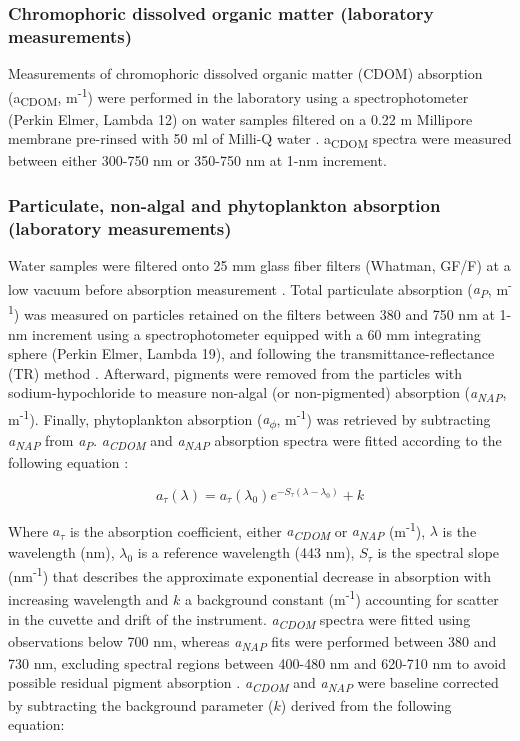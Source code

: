 \documentclass[essd, manuscript]{copernicus}
\begin{document}
\subsubsection{Chromophoric dissolved organic matter (laboratory measurements)}

Measurements of chromophoric dissolved organic matter (CDOM) absorption (a\textsubscript{CDOM}, m\textsuperscript{-1}) were performed in the laboratory using a spectrophotometer (Perkin Elmer, Lambda 12) on water samples filtered on a 0.22 \textmu m Millipore membrane pre-rinsed with 50 ml of Milli-Q water \citep{Babin2003b}. a\textsubscript{CDOM} spectra were measured between either 300-750 nm or 350-750 nm at 1-nm increment.

\subsubsection{Particulate, non-algal and phytoplankton absorption (laboratory measurements)}

Water samples were filtered onto 25 mm glass fiber filters (Whatman, GF/F) at a low vacuum before absorption measurement \citep{Babin2003b}. Total particulate absorption (\textit{a\textsubscript{P}}, m\textsuperscript{-1}) was measured on particles retained on the filters between 380 and 750 nm at 1-nm increment using a spectrophotometer equipped with a 60 mm integrating sphere (Perkin Elmer, Lambda 19), and following the transmittance-reflectance (TR) method \citep{Tassan1995, Tassan1998}. Afterward, pigments were removed from the particles with sodium-hypochloride to measure non-algal (or non-pigmented) absorption (\textit{a\textsubscript{NAP}}, m\textsuperscript{-1}). Finally, phytoplankton absorption (\textit{a\textsubscript{$\phi$}}, m\textsuperscript{-1}) was retrieved by subtracting \textit{a\textsubscript{NAP}} from \textit{a\textsubscript{P}}. \textit{a\textsubscript{CDOM}} and \textit{a\textsubscript{NAP}} absorption spectra were fitted according to the following equation \citep{Jerlov1968, Bricaud1981a}:

\begin{equation}
    a_\tau(\lambda) = a_\tau(\lambda_0)e^{-S_\tau(\lambda - \lambda_0)} + k
\end{equation}

Where $a_\tau$ is the absorption coefficient, either \textit{a\textsubscript{CDOM}} or \textit{a\textsubscript{NAP}} (m\textsuperscript{-1}), $\lambda$ is the wavelength (nm), $\lambda_0$ is a reference wavelength (443 nm), $S_\tau$ is the spectral slope (nm\textsuperscript{-1}) that describes the approximate exponential decrease in absorption with increasing wavelength and $k$ a background constant (m\textsuperscript{-1}) accounting for scatter in the cuvette and drift of the instrument. \textit{a\textsubscript{CDOM}} spectra were fitted using observations below 700 nm, whereas \textit{a\textsubscript{NAP}} fits were performed between 380 and 730 nm, excluding spectral regions between 400-480 nm and 620-710 nm to avoid possible residual pigment absorption \citep{Babin2003b}. \textit{a\textsubscript{CDOM}} and \textit{a\textsubscript{NAP}} were baseline corrected by subtracting the background parameter ($k$) derived from the following equation:
\end{document}
